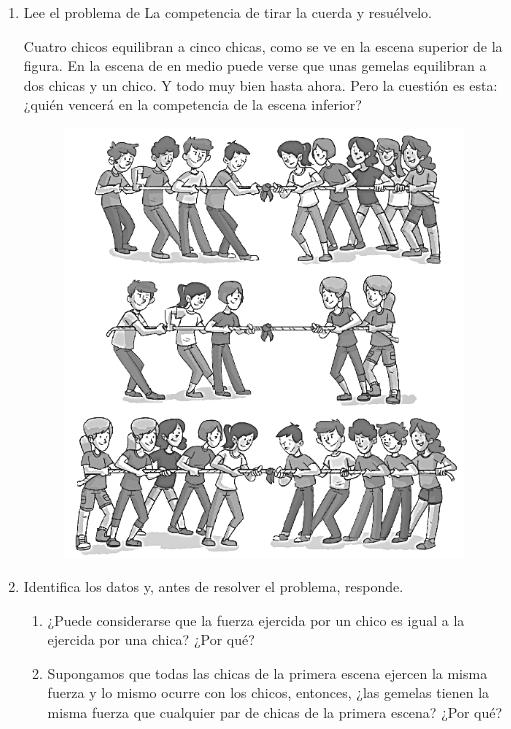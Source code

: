 \documentclass[11pt]{book}
\begin{document}
\begin{boxK}
    \begin{enumerate}
        \item  Lee el problema de La competencia de tirar la cuerda y resuélvelo.

              \begin{boxF}
                  Cuatro chicos equilibran a cinco chicas, como se ve en la escena superior de la
                  figura. En la escena de en medio puede verse que unas gemelas equilibran a dos
                  chicas y un chico. Y todo muy bien hasta ahora. Pero la cuestión es esta: ¿quién
                  vencerá en la competencia de la escena inferior?
              \end{boxF}

              \begin{figure}[H]
                  \centering
                  \includegraphics[width=0.7\linewidth]{tira_cuerda.png}
                  \label{fig:tira_cuerda}
              \end{figure}

        \item Identifica los datos y, antes de resolver el problema, responde.
              \begin{enumerate}
                  \item ¿Puede considerarse que la fuerza ejercida por un chico es igual a la ejercida por una chica? ¿Por qué?
                  \item Supongamos que todas las chicas de la primera escena ejercen la misma
                        fuerza y lo mismo ocurre con los chicos, entonces, ¿las gemelas tienen la
                        misma fuerza que cualquier par de chicas de la primera escena? ¿Por qué?
              \end{enumerate}


\end{enumerate}
\end{boxK}
\end{document}
